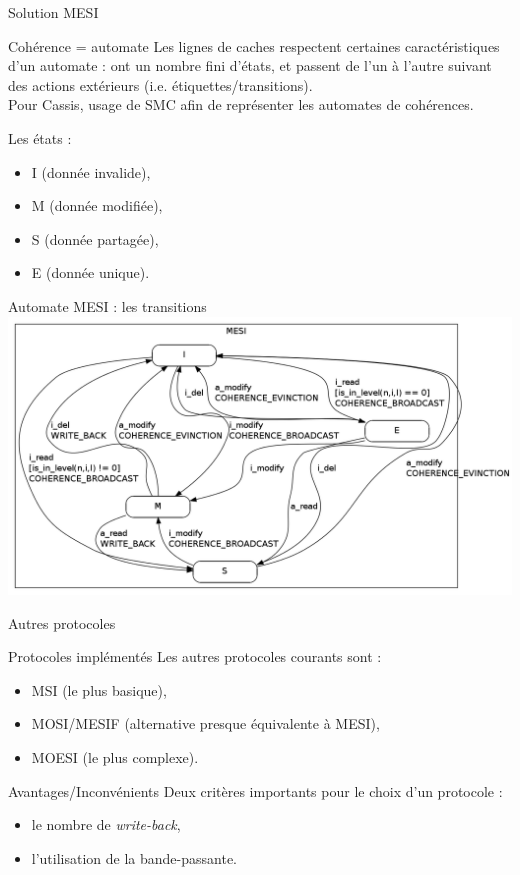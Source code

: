 \begin{frame}{Solution MESI}
  \begin{block}{Cohérence = automate}
    Les lignes de caches respectent certaines caractéristiques d'un automate : ont un nombre fini d'états, et passent de l'un à l'autre suivant des actions extérieurs (i.e. étiquettes/transitions).\\
    Pour \textsf{Cassis}, usage de \textsf{SMC} afin de représenter les automates de cohérences.
  \end{block}
  
  \begin{block}{Les états :}
    \begin{itemize}
    \item{I (donnée invalide),}
    \item{M (donnée modifiée),}
    \item{S (donnée partagée),}
    \item{E (donnée unique).}
    \end{itemize}
  \end{block}
\end{frame}

\begin{frame}{Automate MESI : les transitions}
    \includegraphics[scale=.3]{images/MESI_simple.png}
\end{frame}

\begin{frame}{Autres protocoles}
  \begin{block}{Protocoles implémentés}
    Les autres protocoles courants sont :
    \begin{itemize}
    \item{MSI (le plus basique),}
    \item{MOSI/MESIF (alternative presque équivalente à MESI),}
    \item{MOESI (le plus complexe).}
    \end{itemize}
  \end{block}
  
  \begin{block}{Avantages/Inconvénients}
    Deux critères importants pour le choix d'un protocole :
    \begin{itemize}
    \item{le nombre de \emph{write-back},}
    \item{l'utilisation de la bande-passante.}
    \end{itemize}
  \end{block}
\end{frame}

